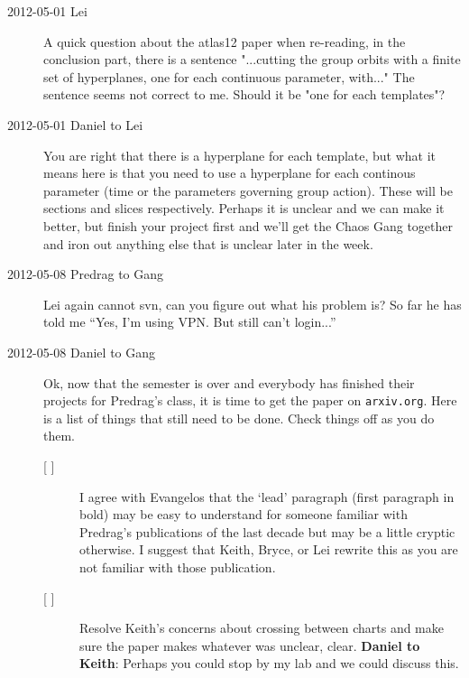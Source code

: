 \begin{description}
\item[2012-05-01 Lei] A quick question about the atlas12 paper when re-reading, in the conclusion part, there is a sentence "...cutting the group orbits with a finite set of hyperplanes, one for each continuous parameter, with..." The sentence seems not correct to me. Should it be "one for each templates"?

\item[2012-05-01 Daniel to Lei] You are right that there is a hyperplane for each template, but what it means here is that you need to use a hyperplane for each continous parameter (time or the parameters governing group action). These will be sections and slices respectively. Perhaps it is unclear and we can make it better, but finish your project first and we'll get the Chaos Gang together and iron out anything else that is unclear later in the week.

\item[2012-05-08 Predrag to Gang]  Lei again cannot svn, can you figure
out what his problem is? So far he has told me ``Yes, I'm using VPN. But
still can't login...''

\item[2012-05-08 Daniel to Gang] Ok, now that the semester is over and
everybody has finished their projects for Predrag's class, it is time to
get the paper on \texttt{arxiv.org}. Here is a list of things that still
need to be done. Check things off as you do them.

\begin{description}

\item[{[ ]}] I agree with Evangelos that the `lead' paragraph (first paragraph in bold) may be easy to understand for someone familiar with Predrag's publications of the last decade but may be a little cryptic otherwise. I suggest that Keith, Bryce, or Lei rewrite this as you are not familiar with those publication.

\item[{[ ]}] Resolve Keith's concerns about crossing between charts and make sure the paper makes whatever was unclear, clear. {\bf Daniel to Keith}: Perhaps you could stop by my lab and we could discuss this.


\end{description}
\end{description}
